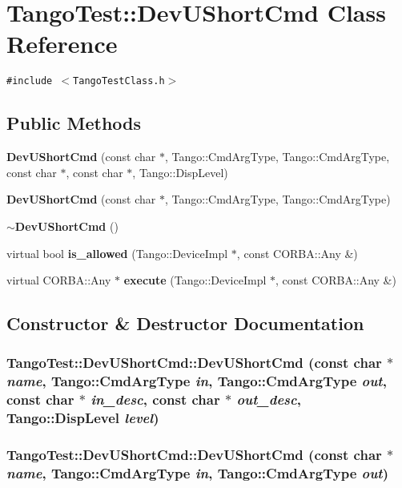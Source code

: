 \section{Tango\-Test::Dev\-UShort\-Cmd  Class Reference}
\label{classTangoTest_1_1DevUShortCmd}
{\tt \#include $<$Tango\-Test\-Class.h$>$}

\subsection*{Public Methods}
\begin{CompactItemize}
\item 
{\bf Dev\-UShort\-Cmd} (const char $\ast$, Tango::Cmd\-Arg\-Type, Tango::Cmd\-Arg\-Type, const char $\ast$, const char $\ast$, Tango::Disp\-Level)
\item 
{\bf Dev\-UShort\-Cmd} (const char $\ast$, Tango::Cmd\-Arg\-Type, Tango::Cmd\-Arg\-Type)
\item 
{\bf $\sim$Dev\-UShort\-Cmd} ()
\item 
virtual bool {\bf is\_\-allowed} (Tango::Device\-Impl $\ast$, const CORBA::Any \&)
\item 
virtual CORBA::Any $\ast$ {\bf execute} (Tango::Device\-Impl $\ast$, const CORBA::Any \&)
\end{CompactItemize}


\subsection{Constructor \& Destructor Documentation}
\subsubsection{\setlength{\rightskip}{0pt plus 5cm}Tango\-Test::Dev\-UShort\-Cmd::Dev\-UShort\-Cmd (const char $\ast$ {\em name}, Tango::Cmd\-Arg\-Type {\em in}, Tango::Cmd\-Arg\-Type {\em out}, const char $\ast$ {\em in\_\-desc}, const char $\ast$ {\em out\_\-desc}, Tango::Disp\-Level {\em level})}\label{classTangoTest_1_1DevUShortCmd_a0}


\subsubsection{\setlength{\rightskip}{0pt plus 5cm}Tango\-Test::Dev\-UShort\-Cmd::Dev\-UShort\-Cmd (const char $\ast$ {\em name}, Tango::Cmd\-Arg\-Type {\em in}, Tango::Cmd\-Arg\-Type {\em out})}\label{classTangoTest_1_1DevUShortCmd_a1}


